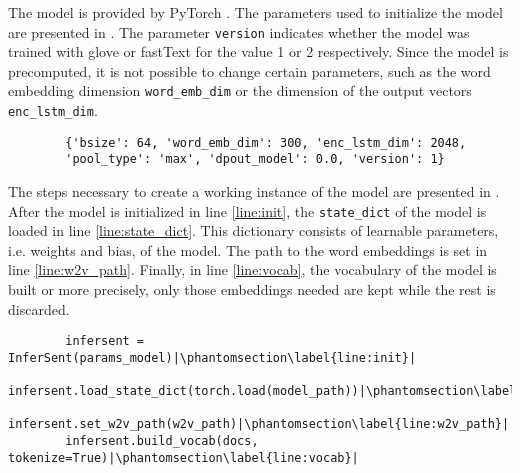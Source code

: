 \subsubsection*{\infersent{}}\label{subsubsec:impl-infersent}

The \infersent{} model is provided by PyTorch \cite{HfsentTrans2019}.
The parameters used to initialize the model are presented in .
The parameter \texttt{version} indicates whether the model was trained with \acs{glove} or fastText for the value 1 or 2 respectively.
Since the model is precomputed, it is not possible to change certain parameters, 
such as the word embedding dimension \texttt{word\_emb\_dim} or the dimension of the output vectors \texttt{enc\_lstm\_dim}.

\begin{listing}[htp]
    \begin{verbatim}
        {'bsize': 64, 'word_emb_dim': 300, 'enc_lstm_dim': 2048,  
        'pool_type': 'max', 'dpout_model': 0.0, 'version': 1}
    \end{verbatim}
    \caption{Parameters of the \infersent{} model.
    }
    \label{lst:infersent-params}
\end{listing}

The steps necessary to create a working instance of the \infersent{} model are presented in .
After the \infersent{} model is initialized in line \ref{line:init}, the \texttt{state\_dict} of the model is loaded in line \ref{line:state_dict}.
This dictionary consists of learnable parameters, i.e. weights and bias, of the model.
The path to the word embeddings is set in line \ref{line:w2v_path}.
Finally, in line \ref{line:vocab}, the vocabulary of the model is built or more precisely, only those embeddings needed are kept while the rest is discarded.

\begin{listing}[htp]
    \begin{verbatim}
        infersent = InferSent(params_model)|\phantomsection\label{line:init}|
        infersent.load_state_dict(torch.load(model_path))|\phantomsection\label{line:state_dict}|
        infersent.set_w2v_path(w2v_path)|\phantomsection\label{line:w2v_path}|
        infersent.build_vocab(docs, tokenize=True)|\phantomsection\label{line:vocab}|
    \end{verbatim}
    \caption{Initializing the \infersent{} model.
    }
    \label{lst:infersent-init}
\end{listing}

